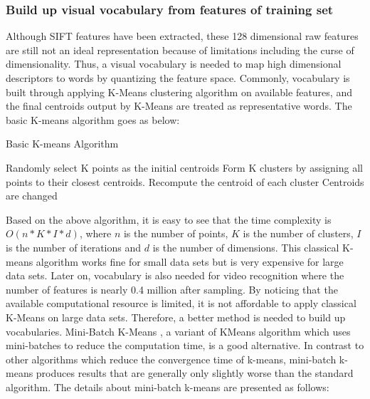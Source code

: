 \subsubsection{Build up visual vocabulary from features of training set}
Although SIFT features have been extracted, these 128 dimensional raw features are still not an ideal representation because of limitations including the curse of dimensionality. Thus, a visual vocabulary is needed to map high dimensional descriptors to words by quantizing the feature space. Commonly, vocabulary is built through applying K-Means \cite{lloyd1982least} clustering algorithm on available features, and the final centroids output by K-Means are treated as representative words. The basic K-means algorithm goes as below:

\begin{algorithm}
  \caption{Basic K-means Algorithm}
  \begin {algorithmic}[1]
  \State Randomly select K points as the initial centroids
  \Do 
    \State Form K clusters by assigning all points to their closest centroids.
    \State Recompute the centroid of each cluster
  \doWhile Centroids are changed
  \end{algorithmic}
\end{algorithm}

\noindent Based on the above algorithm, it is easy to see that the time complexity is $O(n*K*I*d)$, where $n$ is the number of points, $K$ is the number of clusters, $I$ is the number of iterations and $d$ is the number of dimensions. This classical K-means algorithm works fine for small data sets but is very expensive for large data sets. Later on, vocabulary is also needed for video recognition where the number of features is nearly 0.4 million after sampling. By noticing that the available computational resource is limited, it is not affordable to apply classical K-Means on large data sets. Therefore, a better method is needed to build up vocabularies.  Mini-Batch K-Means \cite{sculley2010web}, a variant of KMeans algorithm which uses mini-batches to reduce the computation time, is a good alternative. In contrast to other algorithms which reduce the convergence time of k-means, mini-batch k-means produces results that are generally only slightly worse than the standard algorithm. The details about mini-batch k-means are presented as follows:

